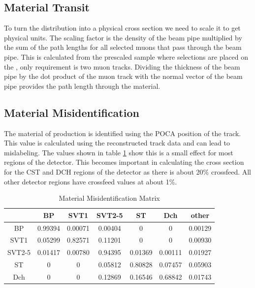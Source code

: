 \subsection{Material Transit}
	To turn the \deltaray distribution into a physical cross section we need to scale it to get physical units. The scaling factor is the density of the beam pipe multiplied by the sum of the path lengths for all selected muons that pass through the beam pipe. This is calculated from the prescaled sample where selections are placed on the \deltarays, only requirement is two muon tracks. Dividing the thickness of the beam pipe by the dot product of the muon track with the normal vector of the beam pipe provides the path length through the material.
\subsection{Material Misidentification}
	The material of \deltaray production is identified using the POCA position of the \deltaray track. This value is calculated using the reconstructed track data and can lead to mislabeling. The values shown in table \ref{tab:Xfeed} show this is a small effect for most regions of the detector. This becomes important in calculating the cross section for the CST and DCH regions of the detector as there is about 20\% crossfeed. All other detector regions have crossfeed values at about 1\%.
	\begin{table}[htb]
		\begin{center}
			\caption{Material Misidentification Matrix}
			\label{tab:Xfeed}
			\begin{tabular}{||c|c|c|c|c|c|c||}
				\hline
				\hline
				& BP & SVT1 & SVT2-5 & ST & Dch & other\\
				\hline
				BP & 0.99394 & 0.00071 & 0.00404 & 0 & 0 & 0.00129\\
				\hline
				SVT1 & 0.05299 & 0.82571 & 0.11201 & 0 & 0 & 0.00930\\
				\hline
				SVT2-5 & 0.01417 & 0.00780 & 0.94395 & 0.01369 & 0.00111 & 0.01927\\
				\hline
				ST & 0 & 0 & 0.05812 & 0.80828 & 0.07457 & 0.05903\\
				\hline
				Dch & 0 & 0 & 0.12869 & 0.16546 & 0.68842 &0.01743\\
				\hline
				\hline
			\end{tabular}
		\end{center}
	\end{table}
		
